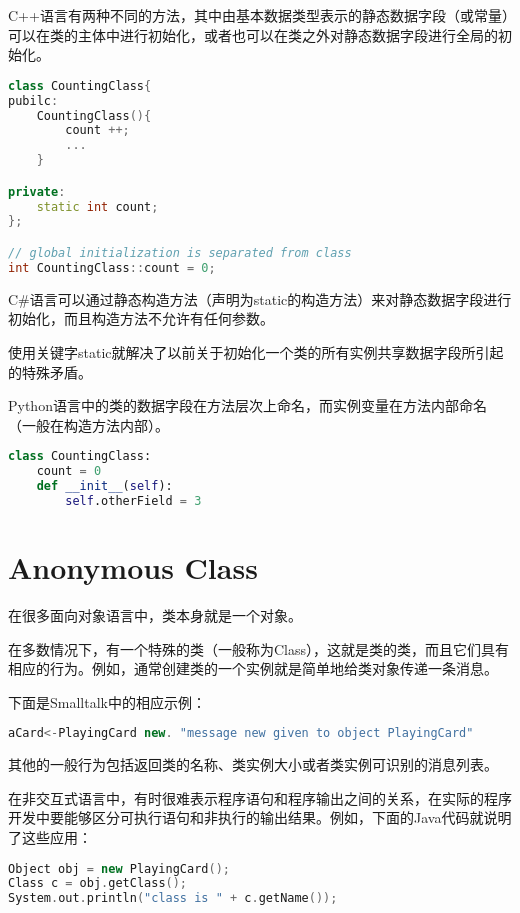 C++语言有两种不同的方法，其中由基本数据类型表示的静态数据字段（或常量）可以在类的主体中进行初始化，或者也可以在类之外对静态数据字段进行全局的初始化。



\begin{lstlisting}[language=C++]
class CountingClass{
pubilc:
	CountingClass(){
		count ++;
		...
	}

private:
	static int count;
};

// global initialization is separated from class
int CountingClass::count = 0;
\end{lstlisting}

C\#语言可以通过静态构造方法（声明为static的构造方法）来对静态数据字段进行初始化，而且构造方法不允许有任何参数。


使用关键字static就解决了以前关于初始化一个类的所有实例共享数据字段所引起的特殊矛盾。

Python语言中的类的数据字段在方法层次上命名，而实例变量在方法内部命名（一般在构造方法内部）。

\begin{lstlisting}[language=Python]
class CountingClass:
	count = 0
	def __init__(self):
		self.otherField = 3
\end{lstlisting}



\section{Anonymous Class}

在很多面向对象语言中，类本身就是一个对象。

在多数情况下，有一个特殊的类（一般称为Class），这就是类的类，而且它们具有相应的行为。例如，通常创建类的一个实例就是简单地给类对象传递一条消息。




下面是Smalltalk中的相应示例：

\begin{lstlisting}[language=C++]
aCard<-PlayingCard new. "message new given to object PlayingCard"
\end{lstlisting}

其他的一般行为包括返回类的名称、类实例大小或者类实例可识别的消息列表。

在非交互式语言中，有时很难表示程序语句和程序输出之间的关系，在实际的程序开发中要能够区分可执行语句和非执行的输出结果。例如，下面的Java代码就说明了这些应用：




\begin{lstlisting}[language=C++]
Object obj = new PlayingCard();
Class c = obj.getClass();
System.out.println("class is " + c.getName());
\end{lstlisting}

